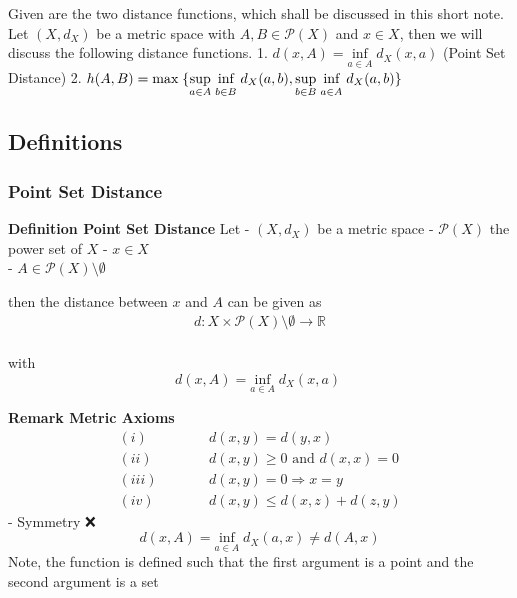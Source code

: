 \documentclass[
]{article}
\author{}
\date{}
\begin{document}
Given are the two distance functions, which shall be discussed in this
short note. Let \((X,d_{X})\) be a metric space with
\(A,B \in \mathcal{P}(X)\) and \(x \in X\), then we will discuss the
following distance functions. 1.
\(d(x,A) = \underset{a \in A}{\text{inf}}\; d_{X}(x,a)\) (Point Set
Distance) 2.
\(h(A,B) = \underset{}{\text{max}}\;\{ \underset{a \in A}{\text{sup}}\;\underset{b \in B}{\text{inf}\vphantom{\text{p}}}\;d_{X}(a,b), \underset{b \in B}{\text{sup}}\;\underset{a \in A}{\text{inf}\vphantom{\text{p}}}\;d_{X}(a,b)\}\)

\hypertarget{definitions}{%
\subsection{Definitions}\label{definitions}}

\hypertarget{point-set-distance}{%
\subsubsection{Point Set Distance}\label{point-set-distance}}

\textbf{Definition Point Set Distance} Let - \((X,d_{X})\) be a metric
space - \(\mathcal{P}(X)\) the power set of \(X\) - \(x \in X\)\\
- \(A \in \mathcal{P}(X)\setminus \emptyset\)

then the distance between \(x\) and \(A\) can be given as
\[\begin{align} 
 d: X \times \mathcal{P}(X)\setminus \emptyset \to \mathbb{R} 
\end{align}\]\\
with \[ d(x,A) = \underset{a \in A}{\text{inf}} \; d_{X}(x,a)\;\]

\textbf{Remark Metric Axioms} \[\begin{alignat}{2}
(i)& \quad&&d(x,y) = d(y,x) \tag{Symmetry} \\
(ii)& \;\quad&&d(x,y) \geq 0 \text{ and } d(x,x)=0 \tag{Non-Negativeness} \\
(iii)& \quad &&d(x,y)=0 \Rightarrow x=y \tag{Positiveness} \\ 
(iv)& \quad &&d(x,y) \leq d(x,z) + d(z,y) \tag{Triangle Inequality}
\end{alignat}\] - Symmetry ❌
\[d(x,A)=\underset{a \in A}{\text{inf}}\; d_{X}(a,x)\neq d(A,x)\] Note,
the function is defined such that the first argument is a point and the
second argument is a set
\end{document}
